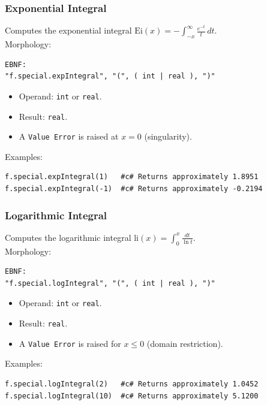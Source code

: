 \subsubsection{Exponential Integral}
Computes the exponential integral $\text{Ei}(x) = -\int_{-x}^{\infty} \frac{e^{-t}}{t}\,dt$. \\
Morphology:
\begin{verbatim}
EBNF:
"f.special.expIntegral", "(", ( int | real ), ")"
\end{verbatim}
\begin{itemize}
\item Operand: \texttt{int} or \texttt{real}.
\item Result: \texttt{real}.
\item A \texttt{Value Error} is raised at $x = 0$ (singularity).
\end{itemize}
Examples:
\begin{verbatim}
f.special.expIntegral(1)   #c# Returns approximately 1.8951
f.special.expIntegral(-1)  #c# Returns approximately -0.2194
\end{verbatim}

\subsubsection{Logarithmic Integral}
Computes the logarithmic integral $\text{li}(x) = \int_0^x \frac{dt}{\ln t}$. \\
Morphology:
\begin{verbatim}
EBNF:
"f.special.logIntegral", "(", ( int | real ), ")"
\end{verbatim}
\begin{itemize}
\item Operand: \texttt{int} or \texttt{real}.
\item Result: \texttt{real}.
\item A \texttt{Value Error} is raised for $x \leq 0$ (domain restriction).
\end{itemize}
Examples:
\begin{verbatim}
f.special.logIntegral(2)   #c# Returns approximately 1.0452
f.special.logIntegral(10)  #c# Returns approximately 5.1200
\end{verbatim}

